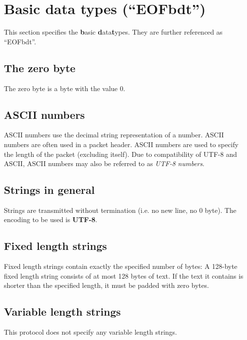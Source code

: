 \section{Basic data types ("`EOFbdt"')}
This section specifies the \textbf{b}asic \textbf{d}ata\textbf{t}ypes. 
They are further referenced as "`EOFbdt"'.
\subsection{The zero byte}
The zero byte is a byte with the value 0.
\subsection{ASCII numbers}
ASCII numbers use the decimal string representation of a number.
ASCII numbers are often used in a packet header.
ASCII numbers are used to specify the length of the packet (excluding itself).
Due to compatibility of UTF-8 and ASCII, ASCII numbers may also be referred to
as \textit{UTF-8 numbers}.
\subsection{Strings in general}
Strings are transmitted without termination (i.e. no new line, no 0 byte).
The encoding to be used is \textbf{UTF-8}.
\subsection{Fixed length strings}
Fixed length strings contain exactly the specified number of bytes:
A 128-byte fixed length string consists of at most 128 bytes of text.
If the text it contains is shorter than the specified length,
it must be padded with zero bytes.
\subsection{Variable length strings}
This protocol does not specify any variable length strings.

